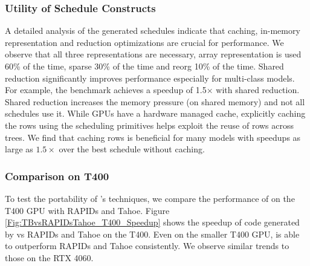 \subsubsection*{Utility of Schedule Constructs}
A detailed analysis of the generated schedules indicate that caching, in-memory representation 
and reduction optimizations are crucial for performance. We observe that all three representations 
are necessary, array representation is used 60\% of the time, sparse 30\% of the time and reorg 10\% of the time. 
Shared reduction significantly improves performance especially for multi-class models. For example, 
the  benchmark achieves a speedup of 1.5$\times$ with shared reduction. 
Shared reduction increases the memory pressure (on shared memory) and not all schedules use it.
While GPUs have a hardware managed cache, explicitly caching the rows using the scheduling primitives 
helps exploit the reuse of rows across trees. We find that caching rows is beneficial for many models
with speedups as large as $1.5\times$ over the best schedule without caching.

\subsubsection*{Comparison on T400}
To test the portability of \Treebeard{}'s techniques, we compare the performance 
of \Treebeard{} on the T400 GPU with RAPIDs and Tahoe. Figure \ref{Fig:TBvsRAPIDsTahoe_T400_Speedup}
shows the speedup of code generated by \Treebeard{} vs RAPIDs and Tahoe on the T400.
Even on the smaller T400 GPU, \Treebeard{} is able to outperform RAPIDs
and Tahoe consistently. We observe similar trends to those on the RTX 4060.

